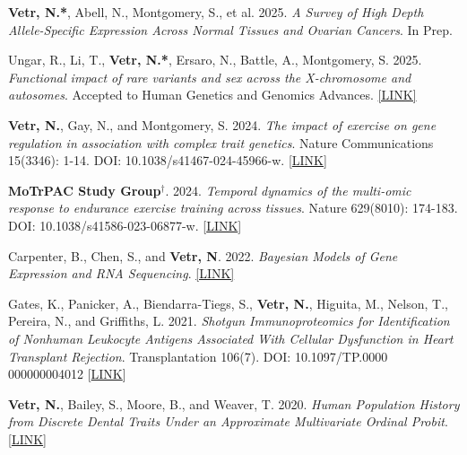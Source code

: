 \documentclass[12pt]{article}
\begin{document}
\begin{enumerate}[label={[\arabic*]}]

\item \textbf{Vetr, N.*}, Abell, N.,  Montgomery, S., et al.  2025.  \emph{A Survey of High Depth Allele-Specific Expression Across Normal Tissues and Ovarian Cancers}.  In Prep.

\item Ungar, R., Li, T., \textbf{Vetr, N.*},  Ersaro, N., Battle, A., Montgomery, S. 2025.  \emph{Functional impact of rare variants and sex across the X-chromosome and autosomes}.  Accepted to Human Genetics and Genomics Advances.  \href{https://www.biorxiv.org/content/10.1101/2025.01.23.634570v1.abstract}{[LINK]}

\item \textbf{Vetr, N.},  Gay,  N.,  and Montgomery,  S.  2024.  \emph{The impact of exercise on gene regulation in association with complex trait genetics}.  Nature Communications 15(3346): 1-14. DOI: 10.1038/s41467-024-45966-w. [\href{https://doi.org/10.1038/s41467-024-45966-w}{LINK}]

\item \textbf{MoTrPAC Study Group}$^{\dag}$. 2024.  \emph{Temporal dynamics of the multi-omic response to endurance exercise training across tissues}.  Nature 629(8010): 174-183. DOI: 10.1038/s41586-023-06877-w. [\href{https://doi.org/10.1038/s41586-023-06877-w.}{LINK}]

\item  Carpenter,  B.,  Chen,  S.,  and \textbf{Vetr,  N}.  2022.  \emph{Bayesian Models of Gene Expression and RNA Sequencing}.  \href{https://github.com/bob-carpenter/BayesExpress/blob/main/latex/bayes-express/bayes-express.tex}{[LINK]}

\item Gates, K., Panicker, A., Biendarra-Tiegs, S., \textbf{Vetr, N.}, Higuita, M., Nelson, T., Pereira, N., and Griffiths, L. 2021.  \emph{Shotgun Immunoproteomics for Identification of Nonhuman Leukocyte Antigens Associated With Cellular Dysfunction in Heart Transplant Rejection}. Transplantation 106(7). DOI: 10.1097/TP.0000\\000000004012 [\href{https://pubmed.ncbi.nlm.nih.gov/34923540/}{LINK}]

\item \textbf{Vetr, N.}, Bailey, S., Moore, B., and Weaver, T. 2020.  \emph{Human Population History from Discrete Dental Traits Under an Approximate Multivariate Ordinal Probit}. [\href{https://github.com/NikVetr/papers/blob/main/plosone-manuscript/mvBM_manuscript_plosone.pdf}{LINK}]


\end{enumerate}
\end{document}

